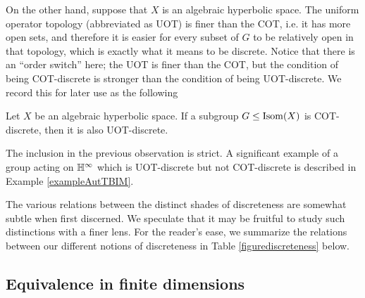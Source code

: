 On the other hand, suppose that $X$ is an algebraic hyperbolic space. The uniform operator topology (abbreviated as UOT) is finer than the COT, i.e. it has more open sets, and therefore it is easier for every subset of $G$ to be relatively open in that topology, which is exactly what it means to be discrete. Notice that there is an ``order switch'' here; the UOT is finer than the COT, but the condition of being COT-discrete is stronger than the condition of being UOT-discrete. We record this for later use as the following 
\begin{observation}
\label{observationCOTUOT}
Let $X$ be an algebraic hyperbolic space. If a subgroup $G\leq\operatorname{Isom}(X)$ is COT-discrete, then it is also UOT-discrete.
\end{observation}

The inclusion in the previous observation is strict. A significant example of a group acting on $\H^\infty$ which is UOT-discrete but not COT-discrete is described in Example \ref{exampleAutTBIM}.

The various relations between the distinct shades of discreteness are somewhat subtle when first discerned. We speculate that it may be fruitful to study such distinctions with a finer lens. For the reader's ease, we summarize the relations between our different notions of discreteness in Table \ref{figurediscreteness} below.

\subsection{Equivalence in finite dimensions}

